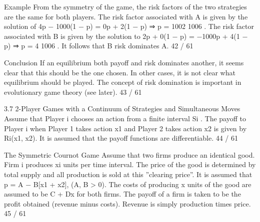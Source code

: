 Example
From the symmetry of the game, the risk factors of the two
strategies are the same for both players.
The risk factor associated with A is given by the solution of
4p − 1000(1 − p) = 0p + 2(1 − p) ⇒ p =
1002
1006
.
The risk factor associated with B is given by the solution to
2p + 0(1 − p) = −1000p + 4(1 − p) ⇒ p =
4
1006
.
It follows that B risk dominates A.
42 / 61

Conclusion
If an equilibrium both payoff and risk dominates another, it seems
clear that this should be the one chosen.
In other cases, it is not clear what equilibrium should be played.
The concept of risk domination is important in evolutionary game
theory (see later).
43 / 61

3.7 2-Player Games with a Continuum of Strategies and
Simultaneous Moves
Assume that Player i chooses an action from a finite interval Si
.
The payoff to Player i when Player 1 takes action x1 and Player 2
takes action x2 is given by Ri(x1, x2).
It is assumed that the payoff functions are differentiable.
44 / 61

The Symmetric Cournot Game
Assume that two firms produce an identical good. Firm i produces
xi units per time interval.
The price of the good is determined by total supply and all
production is sold at this ”clearing price”. It is assumed that
p = A − B[x1 + x2], (A, B > 0).
The costs of producing x units of the good are assumed to be
C + Dx for both firms.
The payoff of a firm is taken to be the profit obtained (revenue
minus costs). Revenue is simply production times price.
45 / 61

